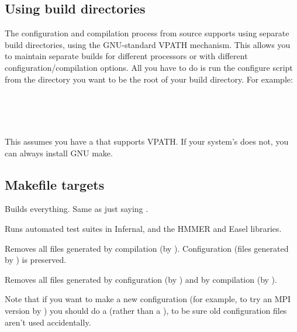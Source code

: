 \subsection{Using build directories}

The configuration and compilation process from source supports using
separate build directories, using the GNU-standard VPATH
mechanism. This allows you to maintain separate builds for different
processors or with different configuration/compilation options. All
you have to do is run the configure script from the directory you want
to be the root of your build directory.  For example:

\\
\\
\\

This assumes you have a  that supports VPATH. If your
system's  does not, you can always install GNU make.

\subsection{Makefile targets}

\begin{sreitems}{}

\item[\emprog{all}]
  Builds everything. Same as just saying .

\item[\emprog{check}]
  Runs automated test suites in Infernal, and the HMMER and Easel
  libraries.

\item[\emprog{clean}]
  Removes all files generated by compilation (by
  ). Configuration (files generated by
  ) is preserved.

\item[\emprog{distclean}]
  Removes all files generated by configuration (by )
  and by compilation (by ). 

  Note that if you want to make a new configuration (for example, to
  try an MPI version by ) you
  should do a  (rather than a ), to be sure old configuration files aren't used
  accidentally.
\end{sreitems}

